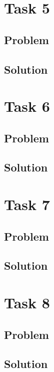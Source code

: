 \documentclass[a4paper, 10pt]{article}
\begin{document}
	\section{Task 5}
	
		\subsection{Problem}
		
		\subsection{Solution}
	
	\section{Task 6}
	
		\subsection{Problem}
		
		\subsection{Solution}
	
	\section{Task 7}
	
		\subsection{Problem}
		
		\subsection{Solution}
	
	\section{Task 8}
	
		\subsection{Problem}
		
		\subsection{Solution}
	
\end{document}
